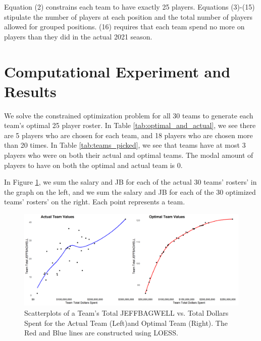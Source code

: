 \documentclass{article}
\begin{document}
Equation (2) constrains each team to have exactly 25 players. Equations (3)-(15) stipulate the number of players at each position and the total number of players allowed for grouped positions. (16) requires that each team spend no more on players than they did in the actual 2021 season. 


\label{tab:optimal_and_actual}


\section{Computational Experiment and Results}

We solve the constrained optimization problem for all 30 teams to generate each team's optimal 25 player roster. In Table \ref{tab:optimal_and_actual}, we see there are 5 players who are chosen for each team, and 18 players who are chosen more than 20 times. In Table \ref{tab:teams_picked}, we see that teams have at most 3 players who were on both their actual and optimal teams. The modal amount of players to have on both the optimal and actual team is 0. 

In Figure \ref{fig:cowplot}, we sum the salary and JB for each of the actual 30 teams' rosters' in the graph on the left, and we sum the salary and JB for each of the 30 optimized teams' rosters' on the right. Each point represents a team.


\begin{figure}[h]
\caption{Scatterplots of a Team's Total JEFFBAGWELL vs. Total Dollars Spent for the Actual Team (Left)and Optimal Team (Right). The Red and Blue lines are constructed using LOESS.} 
\label{fig:cowplot}
\centering
\includegraphics[width=0.7\paperwidth, scale=1.25]{bwar_salary_scatter_cowplot.png}
\end{figure}
\end{document}

